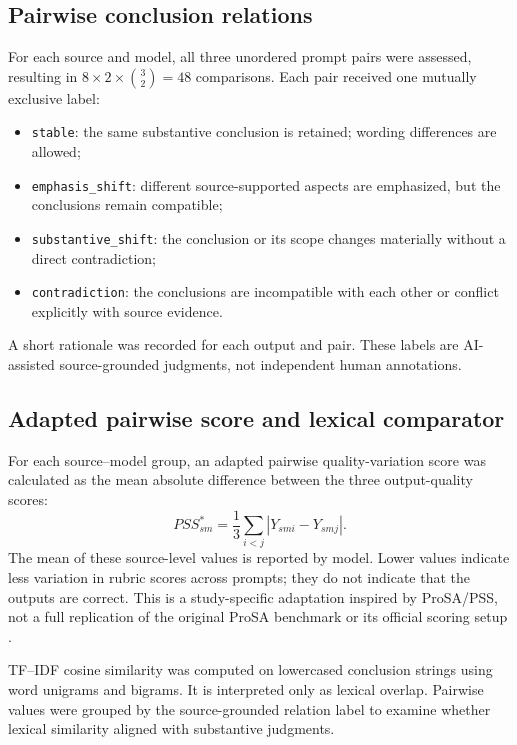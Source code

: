 \documentclass[acmsmall,screen,nonacm]{acmart}
\begin{document}
\subsection{Pairwise conclusion relations}
For each source and model, all three unordered prompt pairs were assessed, resulting in $8\times2\times\binom{3}{2}=48$ comparisons. Each pair received one mutually exclusive label:
\begin{itemize}[leftmargin=*]
  \item \texttt{stable}: the same substantive conclusion is retained; wording differences are allowed;
  \item \texttt{emphasis\_shift}: different source-supported aspects are emphasized, but the conclusions remain compatible;
  \item \texttt{substantive\_shift}: the conclusion or its scope changes materially without a direct contradiction;
  \item \texttt{contradiction}: the conclusions are incompatible with each other or conflict explicitly with source evidence.
\end{itemize}
A short rationale was recorded for each output and pair. These labels are AI-assisted source-grounded judgments, not independent human annotations.

\subsection{Adapted pairwise score and lexical comparator}
For each source--model group, an adapted pairwise quality-variation score was calculated as the mean absolute difference between the three output-quality scores:
\begin{equation}
PSS^{\ast}_{sm}=\frac{1}{3}\sum_{i<j}|Y_{smi}-Y_{smj}|.
\label{eq:pss}
\end{equation}
The mean of these source-level values is reported by model. Lower values indicate less variation in rubric scores across prompts; they do not indicate that the outputs are correct. This is a study-specific adaptation inspired by ProSA/PSS, not a full replication of the original ProSA benchmark or its official scoring setup \cite{zhuo2024}.

TF--IDF cosine similarity was computed on lowercased conclusion strings using word unigrams and bigrams. It is interpreted only as lexical overlap. Pairwise values were grouped by the source-grounded relation label to examine whether lexical similarity aligned with substantive judgments.
\end{document}
